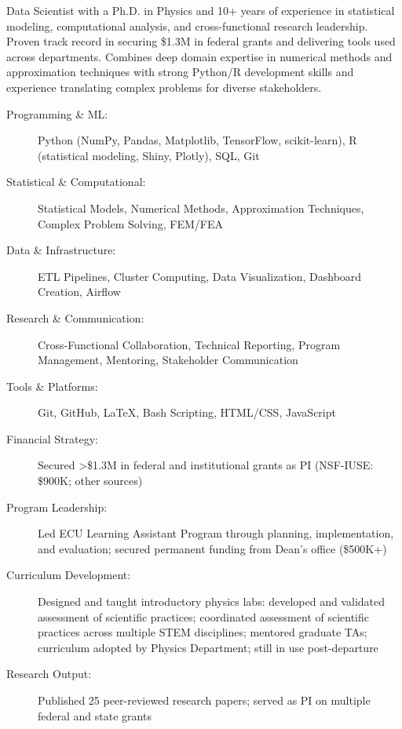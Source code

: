 \documentclass[10pt,letterpaper,ragged2e,withhyper,normalphoto]{altacv}
\begin{document}


\makecvheader


Data Scientist with a Ph.D. in Physics and 10+ years of experience in
statistical modeling, computational analysis, and cross-functional
research leadership. Proven track record in securing \$1.3M in federal
grants and delivering tools used across departments. Combines deep
domain expertise in numerical methods and approximation techniques
with strong Python/R development skills and experience translating
complex problems for diverse stakeholders.


\begin{description}
\item[Programming \& ML:] Python (NumPy, Pandas, Matplotlib,
  TensorFlow, scikit-learn), R (statistical modeling, Shiny, Plotly),
  SQL, Git
\item[Statistical \& Computational:] Statistical Models, Numerical
  Methods, Approximation Techniques, Complex Problem Solving, FEM/FEA
\item[Data \& Infrastructure:] ETL Pipelines, Cluster Computing, Data
  Visualization, Dashboard Creation, Airflow
\item[Research \& Communication:] Cross-Functional Collaboration,
  Technical Reporting, Program Management, Mentoring, Stakeholder
  Communication
\item[Tools \& Platforms:] Git, GitHub, LaTeX, Bash Scripting,
  HTML/CSS, JavaScript
\end{description}


\begin{description}
\item[Financial Strategy:] Secured >\$1.3M in federal and
  institutional grants as PI (NSF-IUSE: \$900K; other sources)
\item[Program Leadership:] Led ECU Learning Assistant Program through
  planning, implementation, and evaluation; secured permanent funding
  from Dean's office (\$500K+)
\item[Curriculum Development:] Designed and taught introductory
  physics labs: developed and validated assessment of scientific
  practices; coordinated assessment of scientific practices across
  multiple STEM disciplines; mentored graduate TAs; curriculum adopted
  by Physics Department; still in use post-departure
\item[Research Output:] Published 25 peer-reviewed research papers;
  served as PI on multiple federal and state grants
\end{description}
\end{document}
